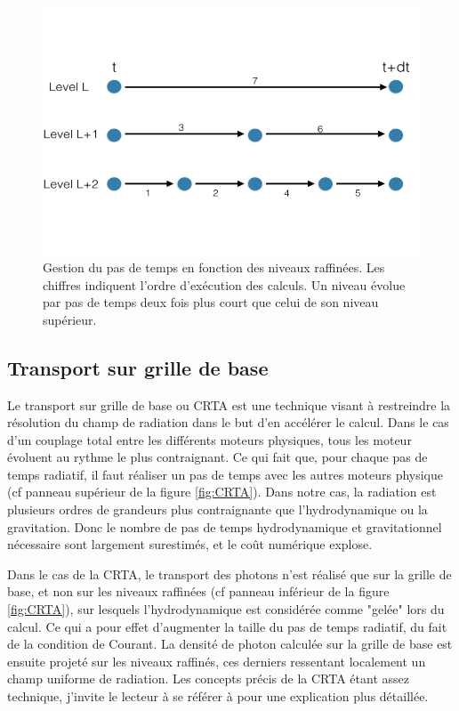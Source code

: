\begin{figure}
\includegraphics[width=.95\linewidth]{img/02/tstep.png}
\caption[Pas de temps AMR]{Gestion du pas de temps en fonction des niveaux raffinées.
Les chiffres indiquent l'ordre d’exécution des calculs.
Un niveau évolue par pas de temps deux fois plus court que celui de son niveau supérieur.
\label{fig:timestep}}
\end{figure}


\subsection{Transport sur grille de base}
\label{sec:crta}

Le transport sur grille de base ou \ac{CRTA} est une technique visant à restreindre la résolution du champ de radiation dans le but d'en accélérer le calcul.
Dans le cas d'un couplage total entre les différents moteurs physiques, tous les moteur évoluent au rythme le plus contraignant.
Ce qui fait que, pour chaque pas de temps radiatif, il faut réaliser un pas de temps avec les autres moteurs physique (cf panneau supérieur de la figure \ref{fig:CRTA}).
Dans notre cas, la radiation est plusieurs ordres de grandeurs plus contraignante que l'hydrodynamique ou la gravitation.
Donc le nombre de pas de temps hydrodynamique et gravitationnel nécessaire sont largement surestimés, et le coût numérique explose.

Dans le cas de la \ac{CRTA}, le transport des photons n'est réalisé que sur la grille de base, et non sur les niveaux raffinées (cf panneau inférieur de la figure \ref{fig:CRTA}), sur lesquels l'hydrodynamique est considérée comme "gelée" lors du calcul.
Ce qui a pour effet d'augmenter la taille du pas de temps radiatif, du fait de la condition de Courant.
La densité de photon calculée sur la grille de base est ensuite projeté sur les niveaux raffinés, ces derniers ressentant localement un champ uniforme de radiation.
Les concepts précis de la \ac{CRTA} étant assez technique, j'invite le lecteur à se référer à \cite{aubert_emma:_2015} pour une explication plus détaillée.

